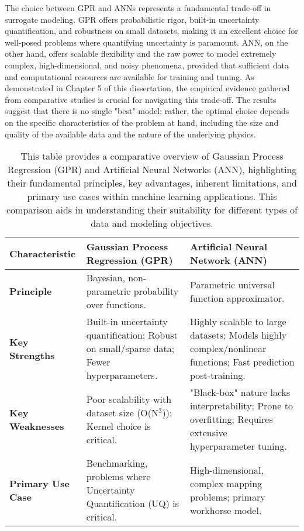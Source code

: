 \documentclass[dsc, EN]{ufabcFHZh}
\begin{document}
{The choice between GPR and ANNs represents a fundamental trade-off in surrogate modeling. GPR offers probabilistic rigor, built-in uncertainty quantification, and robustness on small datasets, making it an excellent choice for well-posed problems where quantifying uncertainty is paramount. ANN, on the other hand, offers scalable flexibility and the raw power to model extremely complex, high-dimensional, and noisy phenomena, provided that sufficient data and computational resources are available for training and tuning. As demonstrated in Chapter 5 of this dissertation, the empirical evidence gathered from comparative studies is crucial for navigating this trade-off. The results suggest that there is no single "best" model; rather, the optimal choice depends on the specific characteristics of the problem at hand, including the size and quality of the available data and the nature of the underlying physics.

\begin{table}[htbp]
    \centering
    \caption{This table provides a comparative overview of Gaussian Process Regression (GPR) and Artificial Neural Networks (ANN), highlighting their fundamental principles, key advantages, inherent limitations, and primary use cases within machine learning applications. This comparison aids in understanding their suitability for different types of data and modeling objectives.}
    \label{tab:gpr_ann_comparison}
    \begin{tabular}{|p{3cm}|p{5.5cm}|p{5.5cm}|}
        \hline
        \textbf{Characteristic} & \textbf{Gaussian Process Regression (GPR)} & \textbf{Artificial Neural Network (ANN)} \\
        \hline
        \textbf{Principle} & Bayesian, non-parametric probability over functions. & Parametric universal function approximator. \\
        \hline
        \textbf{Key Strengths} & Built-in uncertainty quantification; Robust on small/sparse data; Fewer hyperparameters. & Highly scalable to large datasets; Models highly complex/nonlinear functions; Fast prediction post-training. \\
        \hline
        \textbf{Key Weaknesses} & Poor scalability with dataset size (O(N$^3$)); Kernel choice is critical. & "Black-box" nature lacks interpretability; Prone to overfitting; Requires extensive hyperparameter tuning. \\
        \hline
        \textbf{Primary Use Case} & Benchmarking, problems where Uncertainty Quantification (UQ) is critical. & High-dimensional, complex mapping problems; primary workhorse model. \\
        \hline
    \end{tabular}
\end{table}

}
\end{document}
